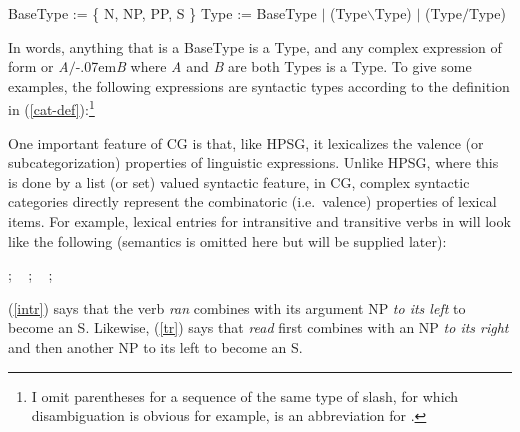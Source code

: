 \documentclass[output=paper,biblatex,babelshorthands,newtxmath,draftmode,colorlinks,citecolor=brown]{langscibook}
\begin{document}
\begin{exe}
 \ex\label{cat-def}
  \begin{xlist}
 \ex\label{bascat}
    BaseType := \{ N,  NP, PP, S \}
 \ex\label{complex-cat}
    Type := BaseType $|$ (Type\ensuremath{\backslash}Type) $|$ (Type\ensuremath{/}Type)
  \end{xlist}
\end{exe}
In words, anything that is a BaseType is a Type, and
any complex expression of form
  or
\textit{A}\ensuremath{/}\kern-.07em\textit{B} where \textit{A} and \textit{B} are both
Types is a Type. To give some examples, the following expressions are
syntactic types according to the definition in
(\ref{cat-def}):\footnote{I omit
parentheses for a sequence of the same type of slash, for which
disambiguation is obvious \emdashUS for example,  is an abbreviation for .}

\begin{exe}
 \ex
  \begin{xlist}
 \ex
 \ex
 \ex
 \ex
  \end{xlist}
\end{exe}

\largerpage[-1]
One important feature of CG is that, like HPSG, it lexicalizes the
valence (or subcategorization) properties of linguistic expressions.
Unlike HPSG, where this is done by a list (or set) valued syntactic
feature, in CG, complex syntactic categories directly represent the
combinatoric (i.e.~valence) properties of lexical items. For example,
lexical entries for intransitive and transitive verbs in  will
look like the following (semantics is omitted here but will be
supplied later):

\begin{exe}
 \ex\label{lex1}
  \begin{xlist}
 \ex\label{intr}
    ; \  
 \ex\label{tr}
    ; \ 
 \ex\label{trthree}
    ; \ 
  \end{xlist}
\end{exe}
(\ref{intr}) says that the verb \textit{ran} combines with its argument NP \emph{to its
left} to become an S. Likewise, (\ref{tr}) says that \textit{read} first
combines with an NP \emph{to its right} and then another NP to its left to
become an S.
\end{document}
